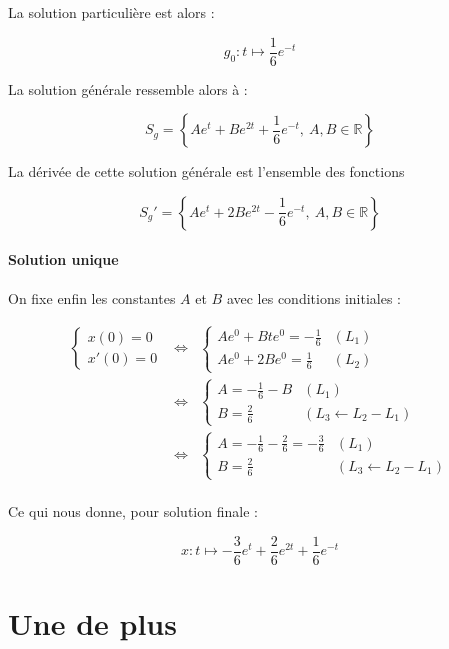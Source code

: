 \documentclass[a4paper, 11pt]{report} %
\newcommand{\R}{\mathbb{R}}
\renewcommand{\mapsto}{\longmapsto}
\begin{document}
La solution particulière est alors :

\[g_0 : t \mapsto \frac{1}{6}e^{-t}\]

La solution générale ressemble alors à :

\[
S_g = \left\{Ae^{t} + Be^{2t} + \frac{1}{6}e^{-t},~A,B\in\R\right\}
\]

La dérivée de cette solution générale est l'ensemble des fonctions

\[
S_g' = \left\{Ae^{t} + 2Be^{2t} - \frac{1}{6}e^{-t},~A,B\in\R\right\}
\]

\paragraph{Solution unique}
On fixe enfin les constantes $A$ et $B$ avec les conditions initiales :

\begin{eqnarray*}
\left\{\begin{array}{l}
x(0) = 0\\
x'(0) = 0
\end{array}\right. & \Leftrightarrow &
\left\{\begin{array}{ll}
Ae^0 + Bte^0 = - \frac{1}{6} & (L_1)\\
Ae^0 + 2Be^0 = \frac{1}{6} & (L_2)
\end{array}\right.\\
& \Leftrightarrow &                     %
\left\{\begin{array}{ll}
A = -\frac{1}{6} - B & (L_1)\\
B = \frac{2}{6} & (L_3 \leftarrow L_2 - L_1)
\end{array}\right.\\
& \Leftrightarrow &                     %
\left\{\begin{array}{ll}
A = -\frac{1}{6} - \frac{2}{6} = -\frac{3}{6} & (L_1)\\
B = \frac{2}{6} & (L_3 \leftarrow L_2 - L_1)
\end{array}\right.\\
\end{eqnarray*}

Ce qui nous donne, pour solution finale :

\[
x : t \mapsto -\frac{3}{6}e^{t} + \frac{2}{6}e^{2t} + \frac{1}{6}e^{-t}
\]

\section{Une de plus} %
\end{document}
